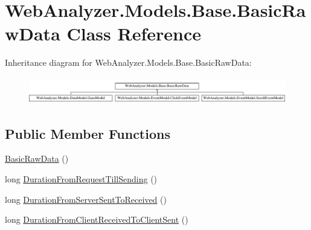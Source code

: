 \hypertarget{class_web_analyzer_1_1_models_1_1_base_1_1_basic_raw_data}{}\section{Web\+Analyzer.\+Models.\+Base.\+Basic\+Raw\+Data Class Reference}
\label{class_web_analyzer_1_1_models_1_1_base_1_1_basic_raw_data}
Inheritance diagram for Web\+Analyzer.\+Models.\+Base.\+Basic\+Raw\+Data\+:\begin{figure}[H]
\begin{center}
\leavevmode
\includegraphics[height=1.181435cm]{class_web_analyzer_1_1_models_1_1_base_1_1_basic_raw_data}
\end{center}
\end{figure}
\subsection*{Public Member Functions}
\begin{DoxyCompactItemize}
\item 
\hyperlink{class_web_analyzer_1_1_models_1_1_base_1_1_basic_raw_data_ab5076eb5c4128eed6a66578dd9585e29}{Basic\+Raw\+Data} ()
\item 
long \hyperlink{class_web_analyzer_1_1_models_1_1_base_1_1_basic_raw_data_a095dc0eb5da23a69aced738d844b2b80}{Duration\+From\+Request\+Till\+Sending} ()
\item 
long \hyperlink{class_web_analyzer_1_1_models_1_1_base_1_1_basic_raw_data_a3bd1dcce4b4dbb7181b0ae3f20a74e3b}{Duration\+From\+Server\+Sent\+To\+Received} ()
\item 
long \hyperlink{class_web_analyzer_1_1_models_1_1_base_1_1_basic_raw_data_aa8efb3ddeee4b023da606951d6dc3caa}{Duration\+From\+Client\+Received\+To\+Client\+Sent} ()
\end{DoxyCompactItemize}
